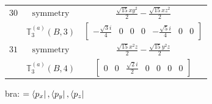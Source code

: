 \documentclass[fleqn,8pt,landscape]{jsarticle}
\begin{document}
\begin{longtable}{ccc}
$ 30 $ & $ \text{symmetry} $ & $ \frac{\sqrt{15} x y^{2}}{2} - \frac{\sqrt{15} x z^{2}}{2} $ \\
$  $ & $ \mathbb{T}_{3}^{(a)}(B,3) $ & $ \begin{bmatrix} - \frac{\sqrt{3} i}{4} & 0 & 0 & 0 & - \frac{\sqrt{5} i}{4} & 0 & 0 \end{bmatrix} $ \\ \hline
$ 31 $ & $ \text{symmetry} $ & $ \frac{\sqrt{15} x^{2} z}{2} - \frac{\sqrt{15} y^{2} z}{2} $ \\
$  $ & $ \mathbb{T}_{3}^{(a)}(B,4) $ & $ \begin{bmatrix} 0 & 0 & \frac{\sqrt{2} i}{2} & 0 & 0 & 0 & 0 \end{bmatrix} $ \\ \hline
\end{longtable}
bra: $=\bra{p_{x}}, \bra{p_{y}}, \bra{p_{z}}$
\end{document}
